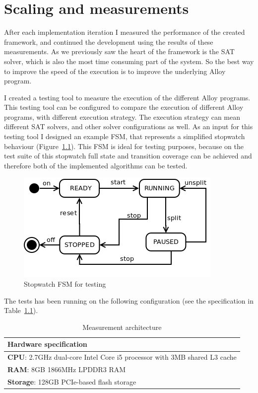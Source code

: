 \chapter{Scaling and measurements}
\label{cha:measurements}

After each implementation iteration I measured the performance of the created framework, and continued the development using the results of these measurements. As we previously saw the heart of the framework is the SAT solver, which is also the most time consuming part of the system. So the best way to improve the speed of the execution is to improve the underlying Alloy program.

I created a testing tool to measure the execution of the different Alloy programs. This testing tool can be configured to compare the execution of different Alloy programs, with different execution strategy. The execution strategy can mean different SAT solvers, and other solver configurations as well. As an input for this testing tool I designed an example FSM, that represents a simplified stopwatch behaviour (Figure~\ref{fig:measurements_stopwatch}). This FSM is ideal for testing purposes, because on the test suite of this stopwatch full state and transition coverage can be achieved and therefore both of the implemented algorithms can be tested.

\begin{figure}[htp]
\centering
\includegraphics[scale=0.5]{figures/measurements_stopwatch}
\caption{Stopwatch FSM for testing}
\label{fig:measurements_stopwatch}
\end{figure}

The tests has been running on the following configuration (see the specification in Table~\ref{tab:hardwarespecification}).

\begin{table}[htb]
\begin{center}
\begin{tabular}{|l|}
\hline
	\textbf{Hardware specification}\\\hline
	\textbf{CPU}: 2.7GHz dual-core Intel Core i5 processor with 3MB shared L3 cache\\
	\textbf{RAM}: 8GB 1866MHz LPDDR3 RAM\\
	\textbf{Storage}: 128GB PCIe-based flash storage\\
\hline
\end{tabular}
\end{center}
\caption{\label{tab:hardwarespecification} Measurement architecture}
\end{table}

